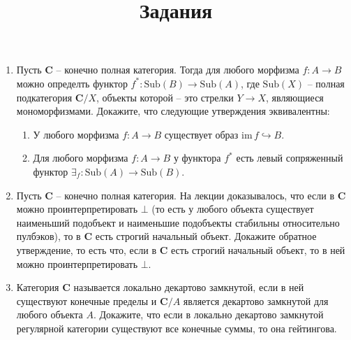 \documentclass[draft]{article}
\newcommand{\cat}[1]{\mathbf{#1}}
\renewcommand{\C}{\cat{C}}
\begin{document}
\title{Задания}
\maketitle

\begin{enumerate}

\item Пусть $\C$ -- конечно полная категория.
Тогда для любого морфизма $f : A \to B$ можно определть функтор $f^* : \mathrm{Sub}(B) \to \mathrm{Sub}(A)$, где $\mathrm{Sub}(X)$ -- полная подкатегория $\C/X$, объекты которой -- это стрелки $Y \to X$, являющиеся мономорфизмами.
Докажите, что следующие утверждения эквивалентны:
\begin{enumerate}
\item У любого морфизма $f : A \to B$ существует образ $\mathrm{im}\,f \hookrightarrow B$.
\item Для любого морфизма $f : A \to B$ у функтора $f^*$ есть левый сопряженный функтор $\exists_f : \mathrm{Sub}(A) \to \mathrm{Sub}(B)$.
\end{enumerate}

\item Пусть $\C$ -- конечно полная категория. На лекции доказывалось, что если в $\C$ можно проинтерпретировать $\bot$ (то есть у любого объекта существует наименьший подобъект и наименьшие подобъекты стабильны относительно пулбэков), то в $\C$ есть строгий начальный объект.
Докажите обратное утверждение, то есть что, если в $\C$ есть строгий начальный объект, то в ней можно проинтерпретировать $\bot$.

\item Категория $\C$ называется локально декартово замкнутой, если в ней существуют конечные пределы и $\C/A$ является декартово замкнутой для любого объекта $A$.
Докажите, что если в локально декартово замкнутой регулярной категории существуют все конечные суммы, то она гейтингова.

\end{enumerate}
\end{document}
